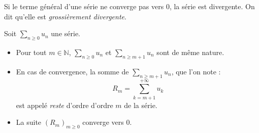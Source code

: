 \documentclass[a4paper,10pt]{report}
\newcommand{\Sum}[2]{\ensuremath{\textstyle{\sum\limits_{#1}^{#2}}}}
\begin{document}
\begin{cor}
Si le terme général d'une série ne converge pas vers $0$, la série est divergente. On dit qu'elle est \textit{grossièrement divergente}.
\end{cor}

%

\begin{defip}
Soit $\Sum{n\geq 0}{} u_n$ une série.
\begin{itemize}
\item Pour tout $m \in \mathbb{N}$, $\Sum{n\geq 0}{}u_n$ et $\Sum{n\geq m+1}{}u_n$ sont de même nature.
\item En cas de convergence, la somme de $\Sum{n\geq m+1}{}u_n$, que l'on note :
$$ R_m = \sum_{k= m+1}^{+\infty}u_k$$
est appelé \textit{reste} d'ordre d'ordre $m$ de la série. 
\item La suite $(R_m)_{m \geq 0}$ converge vers $0$.
\end{itemize}
\end{defip}
%
\begin{preuve}

\vspace{6cm}
%
\end{preuve}
%
\end{document}
